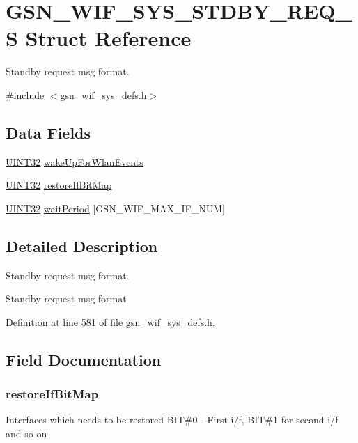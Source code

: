 \hypertarget{a00364}{
\section{GSN\_\-WIF\_\-SYS\_\-STDBY\_\-REQ\_\-S Struct Reference}
\label{a00364}
}


Standby request msg format.  




{\ttfamily \#include $<$gsn\_\-wif\_\-sys\_\-defs.h$>$}

\subsection*{Data Fields}
\begin{DoxyCompactItemize}
\item 
\hyperlink{a00660_gae1e6edbbc26d6fbc71a90190d0266018}{UINT32} \hyperlink{a00364_a3aa7b6bbc3592496f826582ca64fa8db}{wakeUpForWlanEvents}
\item 
\hyperlink{a00660_gae1e6edbbc26d6fbc71a90190d0266018}{UINT32} \hyperlink{a00364_ab4a5a2d52316894cb4be373f46bf30ac}{restoreIfBitMap}
\item 
\hyperlink{a00660_gae1e6edbbc26d6fbc71a90190d0266018}{UINT32} \hyperlink{a00364_abefee9d661c8d167ae23c6fc64b0f54e}{waitPeriod} \mbox{[}GSN\_\-WIF\_\-MAX\_\-IF\_\-NUM\mbox{]}
\end{DoxyCompactItemize}


\subsection{Detailed Description}
Standby request msg format. 

Standby request msg format 

Definition at line 581 of file gsn\_\-wif\_\-sys\_\-defs.h.



\subsection{Field Documentation}
\hypertarget{a00364_ab4a5a2d52316894cb4be373f46bf30ac}{
\subsubsection[{restoreIfBitMap}]{ {\bf restoreIfBitMap}}}
\label{a00364_ab4a5a2d52316894cb4be373f46bf30ac}
Interfaces which needs to be restored BIT\#0 -\/ First i/f, BIT\#1 for second i/f and so on 

